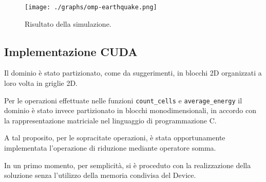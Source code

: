 \begin{figure}[h!]
  \centering
  \texttt{[image: ./graphs/omp-earthquake.png]}
  \caption{Risultato della simulazione.}\label{fig:simulation1}
\end{figure}

\subsection{Implementazione CUDA}

Il dominio è stato partizionato, come da suggerimenti, in blocchi 2D organizzati
a loro volta in griglie 2D.

Per le operazioni effettuate nelle funzioni \texttt{count\_cells} e
\texttt{average\_energy} il dominio è stato invece partizionato in blocchi
monodimensionali, in accordo con la rappresentazione matriciale nel linguaggio
di programmazione C.

A tal proposito, per le sopracitate operazioni, è stata opportunamente
implementata l'operazione di riduzione mediante operatore somma.

In un primo momento, per semplicità, si è proceduto con la realizzazione della
soluzione senza l'utilizzo della memoria condivisa del Device.
